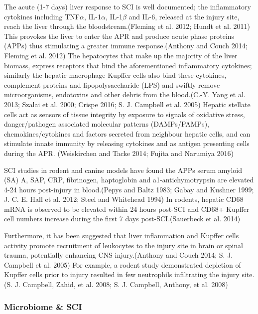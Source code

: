 \documentclass[9pt,lineno]{elife}
\begin{document}
The acute (1-7 days) liver response to SCI is well documented; the inflammatory cytokines including TNF\(\alpha\), IL-1\(\alpha\), IL-1\(\beta\) and IL-6, released at the injury site, reach the liver through the bloodstream.(Fleming et al. 2012; Hundt et al. 2011)
This provokes the liver to enter the APR and produce acute phase proteins (APPs) thus stimulating a greater immune response.(Anthony and Couch 2014; Fleming et al. 2012)
The hepatocytes that make up the majority of the liver biomass, express receptors that bind the aforementioned inflammatory cytokines; similarly the hepatic macrophage Kupffer cells also bind these cytokines, complement proteins and lipopolysaccharide (LPS) and swiftly remove microorganisms, endotoxins and other debris from the blood.(C.-Y. Yang et al. 2013; Szalai et al. 2000; Crispe 2016; S. J. Campbell et al. 2005)
Hepatic stellate cells act as sensors of tissue integrity by exposure to signals of oxidative stress, danger/pathogen associated molecular patterns (DAMPs/PAMPs), chemokines/cytokines and factors secreted from neighbour hepatic cells, and can stimulate innate immunity by releasing cytokines and as antigen presenting cells during the APR. (Weiskirchen and Tacke 2014; Fujita and Narumiya 2016)

SCI studies in rodent and canine models have found the APPs serum amyloid (SA) A, SAP, CRP, fibrinogen, haptoglobin and a1-antichymotrypsin are elevated 4-24 hours post-injury in blood.(Pepys and Baltz 1983; Gabay and Kushner 1999; J. C. E. Hall et al. 2012; Steel and Whitehead 1994)
In rodents, hepatic CD68 mRNA is observed to be elevated within 24 hours post-SCI and CD68+ Kupffer cell numbers increase during the first 7 days post-SCI.(Sauerbeck et al. 2014)

Furthermore, it has been suggested that liver inflammation and Kupffer cells activity promote recruitment of leukocytes to the injury site in brain or spinal trauma, potentially enhancing CNS injury.(Anthony and Couch 2014; S. J. Campbell et al. 2005)
For example, a rodent study demonstrated depletion of Kupffer cells prior to injury resulted in few neutrophils infiltrating the injury site.(S. J. Campbell, Zahid, et al. 2008; S. J. Campbell, Anthony, et al. 2008)

\hypertarget{microbiome-sci}{%
\subsubsection{Microbiome \& SCI}\label{microbiome-sci}}
\end{document}
